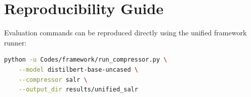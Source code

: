 \section{Reproducibility Guide}
Evaluation commands can be reproduced directly using the unified framework runner:
\begin{lstlisting}[language=bash]
python -u Codes/framework/run_compressor.py \
    --model distilbert-base-uncased \
    --compressor salr \
    --output_dir results/unified_salr
\end{lstlisting}

